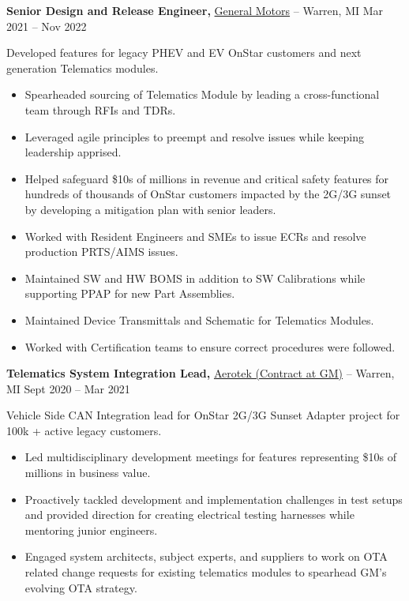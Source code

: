 \documentclass[11pt]{article}       %
\begin{document}
\textbf{Senior Design and Release Engineer,} \href{}{General Motors} -- Warren, MI \hfill Mar 2021 -- Nov 2022 \\
\vspace{-9pt}
\begin{flushleft}
  Developed features for legacy PHEV and EV OnStar customers and next generation Telematics modules.
\end{flushleft}
\vspace{-21pt}
\begin{itemize}
  \item Spearheaded sourcing of Telematics Module by leading a cross-functional team through RFIs and TDRs.
  \item Leveraged agile principles to preempt and resolve issues while keeping leadership apprised.
  \item Helped safeguard \$10s of millions in revenue and critical safety features for hundreds of thousands of OnStar customers impacted by the 2G/3G sunset by developing a mitigation plan with senior leaders.
  \item Worked with Resident Engineers and SMEs to issue ECRs and resolve production PRTS/AIMS issues.
  \item Maintained SW and HW BOMS in addition to SW Calibrations while supporting PPAP for new Part Assemblies.
  \item Maintained Device Transmittals and Schematic for Telematics Modules.
  \item Worked with Certification teams to ensure correct procedures were followed.
\end{itemize}

\textbf{Telematics System Integration Lead,} \href{}{Aerotek (Contract at GM)} -- Warren, MI \hfill Sept 2020 -- Mar 2021 \\
\vspace{-9pt}
\begin{flushleft}
  Vehicle Side CAN Integration lead for OnStar 2G/3G Sunset Adapter project for 100k + active legacy customers.
\end{flushleft}
\vspace{-21pt}
\begin{itemize}
  \item Led multidisciplinary development meetings for features representing \$10s of millions in business value.
  \item Proactively tackled development and implementation challenges in test setups and provided direction for creating electrical testing harnesses while mentoring junior engineers.
  \item Engaged system architects, subject experts, and suppliers to work on OTA related change requests for existing telematics modules to spearhead GM’s evolving OTA strategy.
\end{itemize}
\end{document}
